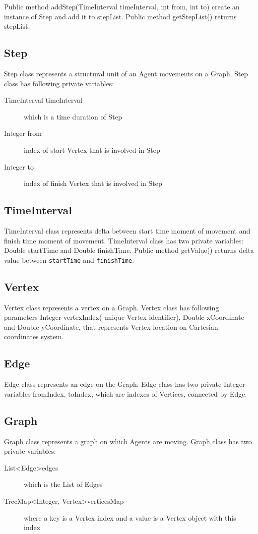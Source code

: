 \documentclass[thesis=B,english]{FITthesis}[2019/12/23]
\begin{document}
Public method addStep(TimeInterval timeInterval, int from, int to) create an instance of Step and add it to stepList. Public method getStepList() returns stepList. 

\subsection{Step}
Step class represents a structural unit of an Agent movements on a Graph. Step class has following private variables: 
\begin{description}
\item[TimeInterval timeInterval] which is a time duration of Step
\item[Integer from] index of start Vertex that is involved in Step
\item[Integer to] index of finish Vertex that is involved in Step
\end{description}

\subsection{TimeInterval}
TimeInterval class represents delta between start time moment of movement and finish time moment of movement. TimeInterval class has two private variables: Double startTime and Double finishTime.
Public method getValue() returns delta value between \verb|startTime| and \verb|finishTime|. 

\subsection{Vertex}
Vertex class represents a vertex on a Graph. Vertex class has following parameters Integer vertexIndex( unique Vertex identifier), Double xCoordinate and Double yCoordinate, that represents Vertex location on Cartesian coordinates system.

\subsection{Edge}
Edge class represents an edge on the Graph. Edge class has two private Integer variables fromIndex, toIndex, which are indexes of Vertices, connected by Edge.

\subsection{Graph}
Graph class represents a graph on which Agents are moving. Graph class has two private variables:
\begin{description}
\item[List\textless Edge\textgreater edges] which is the List of Edges
\item[TreeMap\textless Integer, Vertex\textgreater verticesMap] where a key is a Vertex index and a value is a Vertex object with this index 
\end{description}
\end{document}
